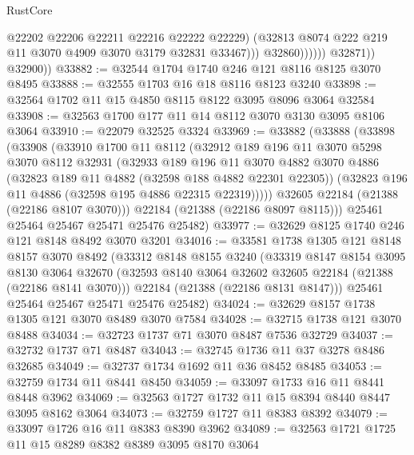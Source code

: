 \begin{lexlean}{RustCore}
\begin{coremodule}
                              @22202
                              @22206
                              @22211
                              @22216
                              @22222
                              @22229)
                            (@32813 @8074 @222 @219 @11 @3070 @4909 @3070 @3179 @32831 @33467)))
                        @32860))))))
            @32871))
        @32900))
@33882 := @32544 @1704 @1740 @246 @121 @8116 @8125 @3070 @8495
@33888 := @32555 @1703 @16 @18 @8116 @8123 @3240
@33898 := @32564 @1702 @11 @15 @4850 @8115 @8122 @3095 @8096 @3064 @32584
@33908 := @32563 @1700 @177 @11 @14 @8112 @3070 @3130 @3095 @8106 @3064
@33910 := @22079 @32525 @3324
@33969 := @33882
    (@33888
      (@33898
        (@33908
          (@33910
            @1700
            @11
            @8112
            (@32912
              @189
              @196
              @11
              @3070
              @5298
              @3070
              @8112
              @32931
              (@32933
                @189
                @196
                @11
                @3070
                @4882
                @3070
                @4886
                (@32823 @189 @11 @4882 (@32598 @188 @4882 @22301 @22305))
                (@32823 @196 @11 @4886 (@32598 @195 @4886 @22315 @22319)))))
          @32605
          @22184
          (@21388 (@22186 @8107 @3070)))
        @22184
        (@21388 (@22186 @8097 @8115)))
      @25461
      @25464
      @25467
      @25471
      @25476
      @25482)
@33977 := @32629 @8125 @1740 @246 @121 @8148 @8492 @3070 @3201
@34016 := @33581
    @1738
    @1305
    @121
    @8148
    @8157
    @3070
    @8492
    (@33312
      @8148
      @8155
      @3240
      (@33319
        @8147
        @8154
        @3095
        @8130
        @3064
        @32670
        (@32593 @8140 @3064 @32602 @32605 @22184 (@21388 (@22186 @8141 @3070)))
        @22184
        (@21388 (@22186 @8131 @8147)))
      @25461
      @25464
      @25467
      @25471
      @25476
      @25482)
@34024 := @32629 @8157 @1738 @1305 @121 @3070 @8489 @3070 @7584
@34028 := @32715 @1738 @121 @3070 @8488
@34034 := @32723 @1737 @71 @3070 @8487 @7536 @32729
@34037 := @32732 @1737 @71 @8487
@34043 := @32745 @1736 @11 @37 @3278 @8486 @32685
@34049 := @32737 @1734 @1692 @11 @36 @8452 @8485
@34053 := @32759 @1734 @11 @8441 @8450
@34059 := @33097 @1733 @16 @11 @8441 @8448 @3962
@34069 := @32563 @1727 @1732 @11 @15 @8394 @8440 @8447 @3095 @8162 @3064
@34073 := @32759 @1727 @11 @8383 @8392
@34079 := @33097 @1726 @16 @11 @8383 @8390 @3962
@34089 := @32563 @1721 @1725 @11 @15 @8289 @8382 @8389 @3095 @8170 @3064

\end{coremodule}
\end{lexlean}
